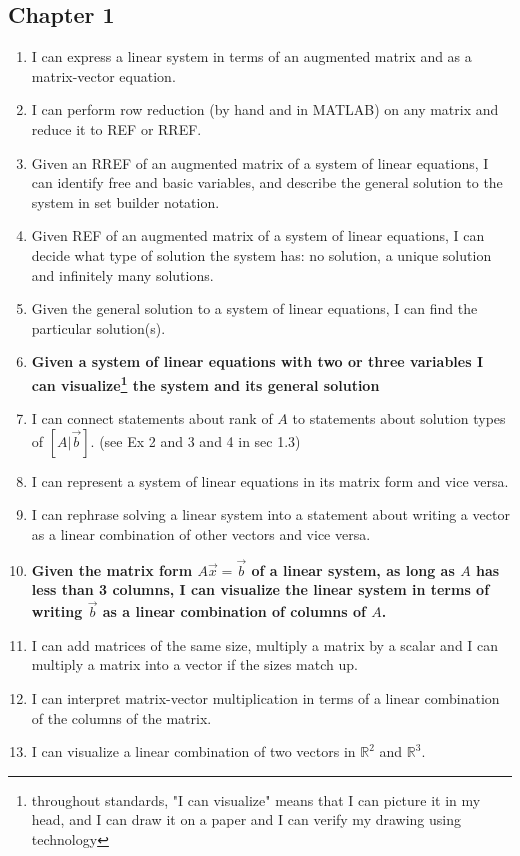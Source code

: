 \documentclass[12pt,oneside,english]{matchapter}
\numberwithin{equation}{section}
\numberwithin{figure}{section}
\begin{document}
\subsection*{Chapter 1}
\begin{enumerate}
	\item I can express a linear system in terms of an augmented matrix and as a matrix-vector equation. 
	\item I can perform row reduction (by hand and in MATLAB) on any matrix and reduce it to REF or RREF.
	\item Given an RREF of an augmented matrix of a system of linear equations, I can identify free and basic variables, and describe the general solution to the system in set builder notation.
	\item Given REF of an augmented matrix of a system of linear equations, I can decide what type of solution the system has: no solution, a unique solution and infinitely many solutions.
	\item Given the general solution to a system of linear equations, I can find the particular solution(s).
	\item \textbf{Given a system of linear equations with two or three variables I can visualize\footnote{throughout standards, "I can visualize" means that I can picture it in my head, and I can draw it on a paper and I can verify my drawing using technology} the system and its general solution  }
	\item I can connect statements about rank of $A$ to statements about solution types of $[A |\vec b]$. (see Ex 2 and 3 and 4 in sec 1.3)
	\item I can represent a system of linear equations in its matrix form and vice versa.
	\item I can rephrase solving a linear system into a statement about writing a vector as a linear combination of other vectors and vice versa. 
	\item \textbf{Given the matrix form $A\vec x=\vec b$ of a linear system, as long as $A$ has less than 3 columns, I can visualize the linear system in terms of writing $\vec b$ as a linear combination of columns of $A$. }
	\item I can add matrices of the same size, multiply a matrix by a scalar and I can multiply a matrix into a vector if the sizes match up. 
	\item I can interpret matrix-vector multiplication in terms of a linear combination of the columns of the matrix.
    \item I can visualize a linear combination of two vectors in $\mathbb R^2$ and $\mathbb R^3$.
\end{enumerate}
\end{document}
